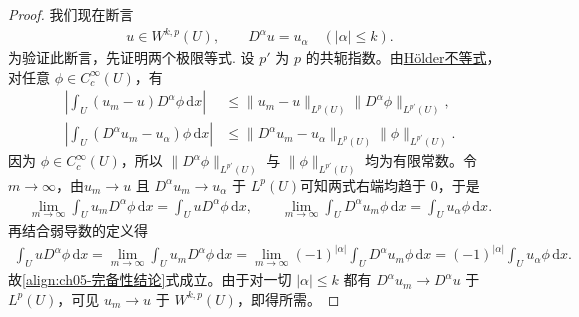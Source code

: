 \documentclass[../../main.tex]{subfiles}
\begin{document}
\begin{proof}
我们现在断言
\begin{align}
u\in W^{k,p}(U),\qquad D^{\alpha}u=u_{\alpha}\quad (|\alpha|\leqslant k).
\label{align:ch05-完备性结论}
\end{align}
为验证此断言，先证明两个极限等式.
设 $p'$ 为 $p$ 的共轭指数。由\hyperref[Real Analysis-theorem:实变函数--Hölder不等式]{Hölder不等式}，对任意 $\phi\in C_{c}^{\infty}(U)$，有
\begin{align*}
\left|\int_{U}(u_{m}-u)D^{\alpha}\phi\,\mathrm{d}x\right|
&\leqslant\|u_{m}-u\|_{L^{p}(U)}\|D^{\alpha}\phi\|_{L^{p'}(U)},\\
\left|\int_{U}(D^{\alpha}u_{m}-u_{\alpha})\phi\,\mathrm{d}x\right|
&\leqslant\|D^{\alpha}u_{m}-u_{\alpha}\|_{L^{p}(U)}\|\phi\|_{L^{p'}(U)}.
\end{align*}
因为 $\phi\in C_{c}^{\infty}(U)$，所以 $\|D^{\alpha}\phi\|_{L^{p'}(U)}$ 与 $\|\phi\|_{L^{p'}(U)}$ 均为有限常数。令 $m\to\infty$，由$u_m\to u$ 且 $D^{\alpha}u_m\to u_{\alpha}$ 于 $L^{p}(U)$可知两式右端均趋于 $0$，于是
\begin{align*}
\lim_{m\to\infty}\int_{U}u_{m}D^{\alpha}\phi\,\mathrm{d}x=\int_{U}uD^{\alpha}\phi\,\mathrm{d}x,\qquad
\lim_{m\to\infty}\int_{U}D^{\alpha}u_{m}\phi\,\mathrm{d}x=\int_{U}u_{\alpha}\phi\,\mathrm{d}x.
\end{align*}
再结合弱导数的定义得
\begin{align*}
\int_{U}uD^{\alpha}\phi\,\mathrm{d}x
=\lim_{m\to\infty}\int_{U}u_{m}D^{\alpha}\phi\,\mathrm{d}x=\lim_{m\to\infty}(-1)^{|\alpha|}\int_{U}D^{\alpha}u_{m}\phi\,\mathrm{d}x=(-1)^{|\alpha|}\int_{U}u_{\alpha}\phi\,\mathrm{d}x.
\end{align*}
故\eqref{align:ch05-完备性结论}式成立。由于对一切 $|\alpha|\leqslant k$ 都有 $D^{\alpha}u_{m}\to D^{\alpha}u$ 于 $L^{p}(U)$，可见 $u_{m}\to u$ 于 $W^{k,p}(U)$，即得所需。
\end{proof}
\end{document}
